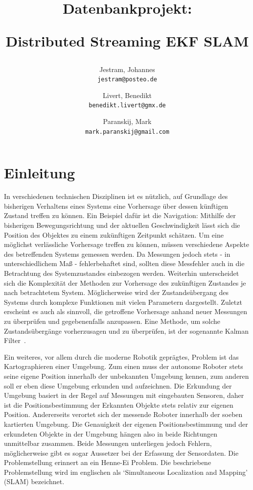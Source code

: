 \documentclass[11pt]{article}
\author{
  	Jestram, Johannes\\
  	\texttt{jestram@posteo.de}
	\and
	Livert, Benedikt\\
	\texttt{benedikt.livert@gmx.de}
	\and
	Paranskij, Mark\\
	\texttt{mark.paranskij@gmail.com}
}
\title{Datenbankprojekt:\par Distributed Streaming EKF SLAM}
\begin{document}
\maketitle
\newpage

\tableofcontents
\newpage

\section{Einleitung}\label{Einleitung}
In verschiedenen technischen Disziplinen ist es nützlich, auf Grundlage des bisherigen Verhaltens eines Systems eine Vorhersage über dessen künftigen Zustand treffen zu können. Ein Beispiel dafür ist die Navigation: Mithilfe der bisherigen Bewegungsrichtung und der aktuellen Geschwindigkeit lässt sich die Position des Objektes zu einem zukünftigen Zeitpunkt schätzen. Um eine möglichst verlässliche Vorhersage treffen zu können, müssen verschiedene Aspekte des betreffenden Systems gemessen werden. Da Messungen jedoch stets - in unterschiedlichem Maß - fehlerbehaftet sind, sollten diese Messfehler auch in die Betrachtung des Systemzustandes einbezogen werden. Weiterhin unterscheidet sich die Komplexität der Methoden zur Vorhersage des zukünftigen Zustandes je nach betrachtetem System. Möglicherweise wird der Zustandsübergang des Systems durch komplexe Funktionen mit vielen Parametern dargestellt. Zuletzt erscheint es auch als sinnvoll, die getroffene Vorhersage anhand neuer Messungen zu überprüfen und gegebenenfalls anzupassen. Eine Methode, um solche Zustandsübergänge vorherzusagen und zu überprüfen, ist der sogenannte Kal\-man Filter~\cite{kalman1960new}.

Ein weiteres, vor allem durch die moderne Robotik geprägtes, Problem ist das Kartographieren einer Umgebung. Zum einen muss der autonome Roboter stets seine eigene Position innerhalb der unbekannten Umgebung kennen, zum anderen soll er eben diese Umgebung erkunden und aufzeichnen. Die Erkundung der Umgebung basiert in der Regel auf Messungen mit eingebauten Sensoren, daher ist die Positionsbestimmung der Erkannten Objekte stets relativ zur eigenen Position. Andererseits verortet sich der messende Roboter innerhalb der soeben kartierten Umgebung. Die Genauigkeit der eigenen Positionsbestimmung und der erkundeten Objekte in der Umgebung hängen also in beide Richtungen unmittelbar zusammen. Beide Messungen unterliegen jedoch Fehlern, möglicherweise gibt es sogar Aussetzer bei der Erfassung der Sensordaten. Die Problemstellung erinnert an ein Henne-Ei Problem. Die beschriebene Problemstellung wird im englischen als ‘Simultaneous Localization and Mapping’ (SLAM) bezeichnet.
\end{document}
